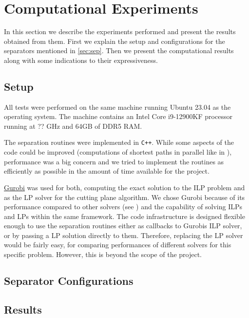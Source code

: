\section{Computational Experiments}\label{sec:comp}
In this section we describe the experiments performed and present the results obtained from them.
First we explain the setup and configurations for the separators mentioned in \cref{sec:sep}.
Then we present the computational results along with some indications to their expressiveness.

\subsection{Setup}\label{subsec:comp_setup}
All tests were performed on the same machine running Ubuntu 23.04 as the operating system.
The machine contains an Intel Core i9-12900KF processor running at ?? GHz and 64GB of DDR5 RAM. 

The separation routines were implemented in \texttt{C++}.
While some aspects of the code could be improved (\eg computations of shortest paths in parallel like in \cite{sorensenSeparationHeuristic2Partition2020}),
performance was a big concern and we tried to implement the routines as efficiently as possible in the amount of time available for the project.

\href{https://www.gurobi.com}{Gurobi} was used for both, computing the exact solution to the ILP problem and as the LP solver for the cutting plane algorithm.
We chose Gurobi because of its performance compared to other solvers (see \cite{meindlAnalysisCommercialFree2012}) and the capability of solving ILPs and LPs within the same framework.
The code infrastructure is designed flexible enough to use the separation routines either as callbacks to Gurobis ILP solver, or by passing a LP solution directly to them.
Therefore, replacing the LP solver would be fairly easy, \eg for comparing performances of different solvers for this specific problem.
However, this is beyond the scope of the project.

\subsection{Separator Configurations}\label{subsec:run_configs}

\subsection{Results}\label{subsec:comp_results}
